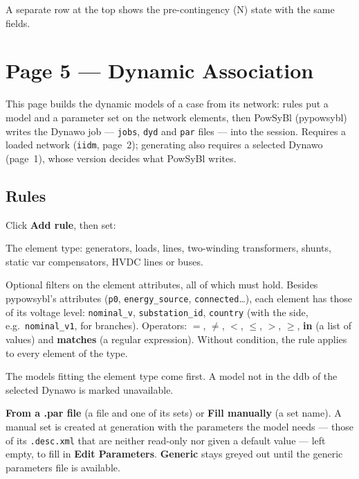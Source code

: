 \documentclass[a4paper,11pt]{article}
\newcommand{\code}[1]{\texttt{\small #1}}
\newcommand{\ftype}[1]{\texttt{\small\color{rteblu}#1}}
\begin{document}
A separate row at the top shows the pre-contingency (N) state with the same
fields.

\section{Page 5 --- Dynamic Association}
\label{sec:dynassoc}

This page builds the dynamic models of a case from its network: rules put a
model and a parameter set on the network elements, then PowSyBl (pypowsybl)
writes the Dynawo job --- \ftype{jobs}, \ftype{dyd} and \ftype{par} files ---
into the session. Requires a loaded network (\ftype{iidm}, page~2); generating
also requires a selected Dynawo (page~1), whose version decides what PowSyBl
writes.

\subsection{Rules}

Click \textbf{Add rule}, then set:

\begin{description}[leftmargin=2em]
  \item[\textbf{Elements}] The element type: generators, loads, lines,
    two-winding transformers, shunts, static var compensators, HVDC lines or
    buses.
  \item[\textbf{Conditions}] Optional filters on the element attributes, all
    of which must hold. Besides pypowsybl's attributes (\code{p0},
    \code{energy\_source}, \code{connected}\ldots), each element has those of
    its voltage level: \code{nominal\_v}, \code{substation\_id},
    \code{country} (with the side, e.g.\ \code{nominal\_v1}, for branches).
    Operators: $=$, $\neq$, $<$, $\le$, $>$, $\ge$, \textbf{in} (a list of
    values) and \textbf{matches} (a regular expression). Without condition, the
    rule applies to every element of the type.
  \item[\textbf{Model}] The models fitting the element type come first. A model
    not in the ddb of the selected Dynawo is marked unavailable.
  \item[\textbf{Parameters}] \textbf{From a .par file} (a file and one of its
    sets) or \textbf{Fill manually} (a set name). A manual set is created at
    generation with the parameters the model needs --- those of its
    \code{.desc.xml} that are neither read-only nor given a default value ---
    left empty, to fill in \textbf{Edit Parameters}. \textbf{Generic} stays
    greyed out until the generic parameters file is available.
\end{description}
\end{document}
